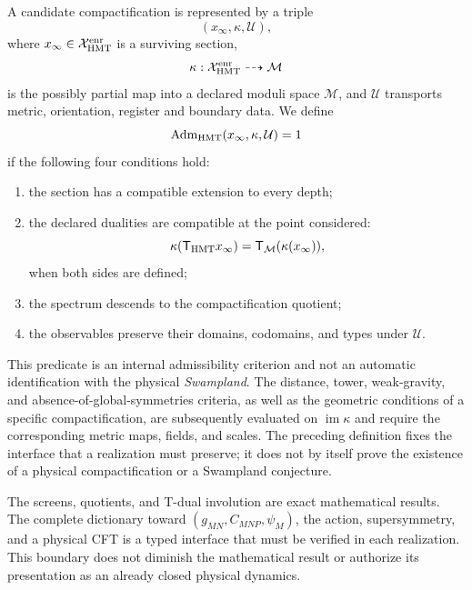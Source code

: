 \begin{definition}
\label{mdp4:def:admisibilidad-compactificacion-hmt-rev3}
A candidate compactification is represented by a triple
\[
 (x_\infty,\kappa,\mathcal U),
\]
where \(x_\infty\in\mathcal X_{\rm HMT}^{\rm enr}\) is a surviving
section,
\[
 \kappa:\mathcal X_{\rm HMT}^{\rm enr}\dashrightarrow\mathcal M
\]
is the possibly partial map into a declared moduli space
\(\mathcal M\), and
\(\mathcal U\) transports metric, orientation, register and boundary data.
We define
\[
 \operatorname{Adm}_{\rm HMT}(x_\infty,\kappa,\mathcal U)=1
\]
if the following four conditions hold:
\begin{enumerate}
 \item the section has a compatible extension to every depth;
 \item the declared dualities are compatible at the point considered:
       \[
        \kappa(\mathsf T_{\rm HMT}x_\infty)
        =\mathsf T_{\mathcal M}(\kappa(x_\infty)),
       \]
       when both sides are defined;
 \item the spectrum descends to the compactification quotient;
 \item the observables preserve their domains, codomains, and types under
       \(\mathcal U\).
\end{enumerate}
\end{definition}

This predicate is an internal admissibility criterion and not an automatic identification with the physical \emph{Swampland}. The distance, tower, weak-gravity, and absence-of-global-symmetries criteria, as well as the geometric conditions of a specific compactification, are subsequently evaluated on \(\operatorname{im}\kappa\) and require the corresponding metric maps, fields, and scales. The preceding definition fixes the interface that a realization must preserve; it does not by itself prove the existence of a physical compactification or a Swampland conjecture.

\begin{statusbox}[title={Scope of the interface}]
The screens, quotients, and T-dual involution are exact
mathematical results. The complete dictionary toward
\((g_{MN},C_{MNP},\psi_M)\), the action, supersymmetry, and a physical CFT is
a typed interface that must be verified in each realization. This boundary
does not diminish the mathematical result or authorize its presentation as an already
closed physical dynamics.
\end{statusbox}
